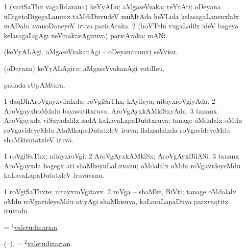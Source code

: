 \bentry
{} 
\gl{\nA}
\expl{}
\bmng
\bnum
\num{1} (variSaThx vagaRdavana) keYyALu; aMgaseVvaka; teYnAti; oDeyana uDigetoDigegaLanunx taMdiDuvudeV muMtAda heVLida kelasagaLanenxlalx mADalu avanoDaneyeV iruva paricAraka. 
\num{2} (hoVTelu \mo vugaLalilx ideV bageya kelasagaLigAgi neVmakavAgiruva) paricAraka; mANi. 
\enum
\emng
\eentry

\bentry
{} 
\gl{\kirx}


\noindent
\gl{\sakirx}
\expl{}
\bmng
 (keYyALAgi, aMgaseVvakanAgi -- oDeyananunx) seVvisu. 
\emng

\noindent 
\gl{\akirx}
\expl{}
\bmng
 (oDeyana) keYyALAgiru; aMgaseVvakanAgi vatiRsu. 
\emng
\eentry

\bentry
{} 
\gl{\nA}
\expl{}
\bmng
  padada rUpAMtara. 
\emng
\eentry

\bentry
{} 
\gl{\gu}
\expl{}
\bmng
\bnum
\num{1} daqDhAroVgayxvilalxda; roVgiSaThx; kAyileya; nitayxroVgiyAda. 
\num{2} AroVgayxhoMdalu bayasutitxruva; AroVgAyxkAMkiSxyAda. 
\num{3} tananx AroVgayxda viSayadalilx sadA kaLavaLapaDutitxruva; tanage oMdalalx oMdu roVgavideyeMdu AtaMkapaDutatxleV iruva; ilalxsalalxda roVgavideyeMdu shaMkisutatxleV iruva. 
\enum
\emng
\eentry

\bentry
{} 
\gl{\nA}
\expl{}
\bmng
\bnum
\num{1} roVgiSaThx; nitayxroVgi. 
\num{2} AroVgAyxkAMkiSx; AroVgAyxBilASi. 
\num{3} tananx AroVgayxda bagegx ati shaMkeyuLaLxvanu; oMdalalx oMdu roVgavideyeMdu kaLavaLapaDutatxleV iruvavanu. 
\enum
\emng
\eentry

\bentry
{} 
\gl{\nA}
\expl{}
\bmng
\bnum
\num{1} roVgiSaThxte; nitayxroVgitavx. 
\num{2} roVga -- shaMke, BiVti; tanage oMdalalx oMdu roVgavideyeMdu atiyAgi shaMkisuva, kaLavaLapaDuva parxvaqtitx iruvudu. 
\enum
\emng
\eentry

\bentry
{} 
\gl{\gu}
\expl{}
\bmng
= \hyperlink{valetudinarian(1)}{$^1$valetudinarian}. 
\emng
\eentry

\bentry
{} 
\gl{\nA}
\expl{}
(\bava\ ). \bmng
= \hyperlink{valetudinarian(2)}{$^2$valetudinarian}. 
\emng
\eentry

